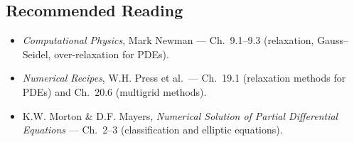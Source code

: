 \subsection*{Recommended Reading}
\begin{itemize}
  \item \textit{Computational Physics}, Mark Newman --- Ch.\ 9.1--9.3
    (relaxation, Gauss–Seidel, over-relaxation for PDEs).
  \item \textit{Numerical Recipes}, W.H. Press et al.\ --- Ch.\ 19.1
    (relaxation methods for PDEs) and Ch.\ 20.6 (multigrid methods).
  \item K.W. Morton \& D.F. Mayers, \textit{Numerical Solution of
    Partial Differential Equations} --- Ch.\ 2--3 (classification and
    elliptic equations).
\end{itemize}
